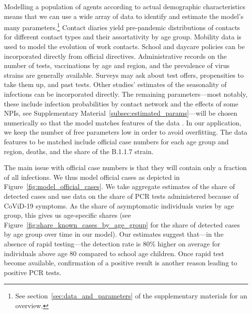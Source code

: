 Modelling a population of agents according to actual demographic characteristics means
that we can use a wide array of data to identify and estimate the model's many
parameters.\footnote{See section~\ref{sec:data_and_parameters} of the supplementary
materials for an overview.} Contact diaries yield pre-pandemic distributions of contacts
for different contact types and their assortativity by age group. Mobility data is used to model the evolution of work
contacts. School and daycare policies can be incorporated directly from official
directives. Administrative records on the number of tests, vaccinations by age and
region, and the prevalence of virus strains are generally available. Surveys may ask
about test offers, propensities to take them up, and past tests. Other studies' estimates
of the seasonality of infections can be incorporated directly. The remaining
parameters---most notably, these include infection probabilities by contact network and
the effects of some NPIs, see Supplementary Material~\ref{subsec:estimated_params}---will
be chosen numerically so that the model matches features of the data \citep[see][for the
general method, also described in Supplementary Material
\ref{subsec:estimated_param}]{McFadden1989}. In our application, we keep the number of
free parameters low in order to avoid overfitting. The data features to be matched
include official case numbers for each age group and region, deaths, and the share of the
B.1.1.7 strain.

The main issue with official case numbers is that they will contain only a fraction of
all infections. We thus model official cases as depicted in
Figure~\ref{fig:model_official_cases}. We take aggregate estimates of the share of
detected cases\comment[id=K]{$\psi$} and use data on the share of PCR tests administered
because of CoViD-19 symptoms. As the share of
asymptomatic individuals varies by age group, this gives us age-specific shares (see
Figure~\ref{fig:share_known_cases_by_age_group} for the share of detected cases by age
group over time in our model). Our estimates suggest that---in the absence of rapid
testing---the detection rate is 80\% higher on average for individuals above age 80
compared to school age children. Once rapid test become available, confirmation of a
positive result is
another reason leading to positive PCR tests.

